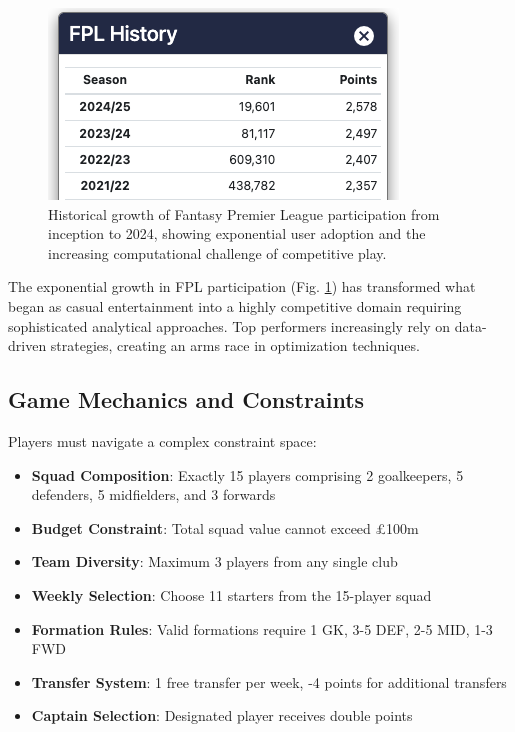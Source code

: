 \documentclass[10pt,a4paper,twocolumn]{article}
\begin{document}
\begin{figure}[h]
\centering
\includegraphics[width=\columnwidth]{../images/fpl_history.png}
\caption{Historical growth of Fantasy Premier League participation from inception to 2024, showing exponential user adoption and the increasing computational challenge of competitive play.}
\label{fig:fpl_history}
\end{figure}

The exponential growth in FPL participation (Fig. \ref{fig:fpl_history}) has transformed what began as casual entertainment into a highly competitive domain requiring sophisticated analytical approaches. Top performers increasingly rely on data-driven strategies, creating an arms race in optimization techniques.

\subsection*{Game Mechanics and Constraints}

Players must navigate a complex constraint space:

\begin{itemize}
\item \textbf{Squad Composition}: Exactly 15 players comprising 2 goalkeepers, 5 defenders, 5 midfielders, and 3 forwards
\item \textbf{Budget Constraint}: Total squad value cannot exceed £100m
\item \textbf{Team Diversity}: Maximum 3 players from any single club
\item \textbf{Weekly Selection}: Choose 11 starters from the 15-player squad
\item \textbf{Formation Rules}: Valid formations require 1 GK, 3-5 DEF, 2-5 MID, 1-3 FWD
\item \textbf{Transfer System}: 1 free transfer per week, -4 points for additional transfers
\item \textbf{Captain Selection}: Designated player receives double points
\end{itemize}
\end{document}
